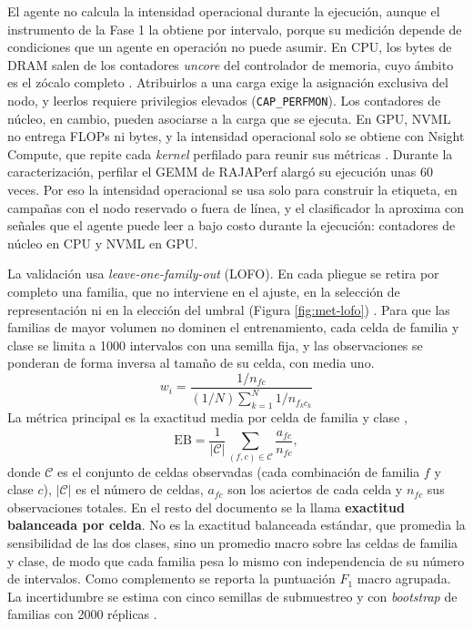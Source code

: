 El agente no calcula la intensidad operacional durante la ejecución, aunque el instrumento de la Fase 1 la obtiene por intervalo, porque su medición depende de condiciones que un agente en operación no puede asumir. En CPU, los bytes de DRAM salen de los contadores \textit{uncore} del controlador de memoria, cuyo ámbito es el zócalo completo \cite{IntelUncore2021}. Atribuirlos a una carga exige la asignación exclusiva del nodo, y leerlos requiere privilegios elevados (\texttt{CAP\_PERFMON}). Los contadores de núcleo, en cambio, pueden asociarse a la carga que se ejecuta. En GPU, NVML no entrega FLOPs ni bytes, y la intensidad operacional solo se obtiene con Nsight Compute, que repite cada \textit{kernel} perfilado para reunir sus métricas \cite{Nsight2026}. Durante la caracterización, perfilar el GEMM de RAJAPerf alargó su ejecución unas 60 veces. Por eso la intensidad operacional se usa solo para construir la etiqueta, en campañas con el nodo reservado o fuera de línea, y el clasificador la aproxima con señales que el agente puede leer a bajo costo durante la ejecución: contadores de núcleo en CPU y NVML en GPU.

La validación usa \textit{leave-one-family-out} (LOFO). En cada pliegue se retira por completo una familia, que no interviene en el ajuste, en la selección de representación ni en la elección del umbral (Figura \ref{fig:met-lofo}) \cite{Roberts2017,Kaufman2012}. Para que las familias de mayor volumen no dominen el entrenamiento, cada celda de familia y clase se limita a 1000 intervalos con una semilla fija, y las observaciones se ponderan de forma inversa al tamaño de su celda, con media uno.
\begin{equation}
w_i=\frac{1/n_{fc}}{(1/N)\sum_{k=1}^{N}1/n_{f_kc_k}}
\label{eq:peso-familia-clase}
\end{equation}
La métrica principal es la exactitud media por celda de familia y clase \cite{Brodersen2010},
\begin{equation}
\mathrm{EB} = \frac{1}{|\mathcal{C}|}\sum_{(f,c)\in\mathcal{C}} \frac{a_{fc}}{n_{fc}},
\label{eq:met-eb}
\end{equation}
donde $\mathcal{C}$ es el conjunto de celdas observadas (cada combinación de familia $f$ y clase $c$), $|\mathcal{C}|$ es el número de celdas, $a_{fc}$ son los aciertos de cada celda y $n_{fc}$ sus observaciones totales. En el resto del documento se la llama \textbf{exactitud balanceada por celda}. No es la exactitud balanceada estándar, que promedia la sensibilidad de las dos clases, sino un promedio macro sobre las celdas de familia y clase, de modo que cada familia pesa lo mismo con independencia de su número de intervalos. Como complemento se reporta la puntuación $F_1$ macro agrupada. La incertidumbre se estima con cinco semillas de submuestreo y con \textit{bootstrap} de familias con 2000 réplicas \cite{EfronTibshirani1993}.

